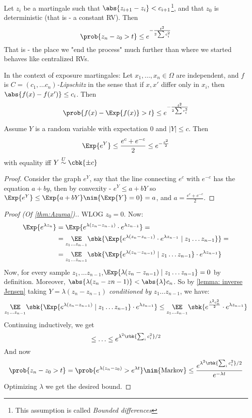 \documentclass[a4paper, 11pt, oneside]{book}
\begin{document}
\begin{thm}
	\label{thm:Azuma} Let $z_i$ be a martingale such that $\abs{z_{i+1}-z_i} < c_{i+1}$\footnote{This assumption is called \emph{Bounded differences}}, and that $z_0$ is deterministic (that is - a constant RV). Then
	\[
	\prob{z_n-z_0 > t}\le e^{-\frac{t^2}{2\sum c_i^2}}
	\]
	That is - the place we "end the process" much further than where we started behaves like centralized RVs.
\end{thm}
\begin{remark}
	In the context of exposure martingales: Let $x_1,\ldots,x_n\in \Omega$ are independent, and $f$ is \emph{$C = (c_1,\ldots c_n)$-Lipschitz} in the sense that if $x,x'$ differ only in $x_i$, then $\abs{f(x)-f(x')}\le c_i$.  Then \[
	\prob{f(x) - \Exp{f(x)} > t}\le e^{-\frac{t^2}{2\sum c_i^2}}\]
\end{remark}
\begin{lemma}
\label{lemma: inverse Jensen}
	Assume $Y$ is a random variable with expectation $0$ and $|Y|\le c$. Then \[
	\Exp{e^Y}\le \frac{e^c + e^{-c}}{2}\le e^{-\frac{c^2}{2}}\] with equality iff $Y \overset{U}{\sim}\cbk{\pm c}$
\end{lemma}
\begin{proof}
	Consider the graph $e^Y$, say that the line connecting $e^c$ with $e^{-c}$ has the equation $a + by$, then by convexity - $e^Y \le a+bY$ so $\Exp{e^Y} \le \Exp{a + bY}\nim{\Exp{Y} = 0}= a$, and $a = \frac{e^c+e^{-c}}{2}$.
\end{proof}
\begin{proof}
	[Proof (Of \autoref{thm:Azuma}).]
	WLOG $z_0 = 0$. Now:
	\begin{align}
	 \Exp{e^{\lambda z_n}} &= \Exp{e^{\lambda(z_n-z_{n-1})}\cdot e^{\lambda z_{n-1}}} = \\
	& = \underset{z_1\ldots z_{n-1}}{\EE}\sbk{\Exp{e^{\lambda(z_n-z_{n-1})}\cdot e^{\lambda z_{n-1}}\mid z_1\ldots z_{n-1}}} = \\
	& = \underset{z_1\ldots z_{n-1}}{\EE}\sbk{\Exp{e^{\lambda(z_n-z_{n-1})}\mid z_1\ldots z_{n-1}}\cdot e^{\lambda z_{n-1}}}
	\end{align}
	Now, for every sample $z_1,\ldots z_{n-1}$,$\Exp{\lambda(z_n-z_{n-1})\mid z_1\ldots z_{n-1}} = 0$ by definition. Moreover, $\abs{\lambda(z_n-z{n-1})}<\abs{\lambda}c_n$. So by \autoref{lemma: inverse Jensen} taking $Y = \lambda(z_n - z_{n-1})$ \emph{conditioned by $z_1\ldots z_{n-1}$}, we have:
	\begin{align*}
		\underset{z_1\ldots z_{n-1}}{\EE}\sbk{\Exp{e^{\lambda(z_n-z_{n-1})}\mid z_1\ldots z_{n-1}}\cdot e^{\lambda z_{n-1}}} \le \underset{z_1\ldots z_{n-1}}{\EE}\sbk{e^{\frac{\lambda^2c_n^2}{2}}\cdot e^{\lambda z_{n-1}}}
	\end{align*}
	Continuing inductively, we get 
	\[
	\le\ldots \le e^{\lambda^2\rbk{\sum_i c_i^2}/2}
	\]
	And now
	\[
	\prob{z_n-z_0 > t} = \prob{e^{\lambda (z_n - z_0)} > e^{\lambda t}} \nim{\textrm{Markov}}\le \frac{e^{\lambda^2\rbk{\sum_i c_i^2}/2}}{e^{-\lambda t}}
	\]
	Optimizing $\lambda$ we get the desired bound.
\end{proof}
\end{document}
